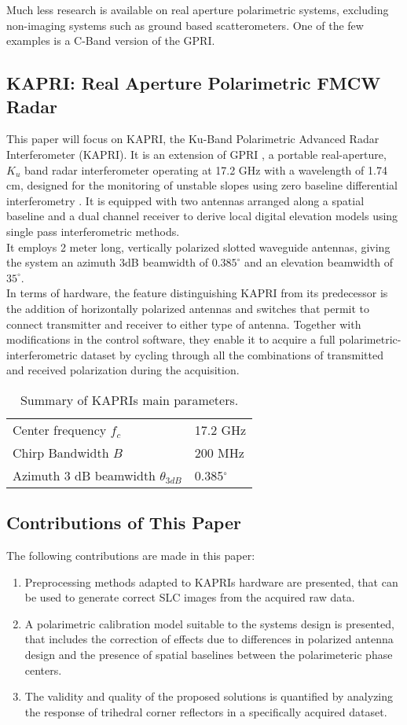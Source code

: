 Much less research is available on real aperture polarimetric systems, excluding non-imaging systems such as ground based scatterometers. One of the few examples is a C-Band version of the GPRI\cite{Cherukumilli2012}.
\subsection{KAPRI: Real Aperture Polarimetric FMCW Radar}
This paper will focus on KAPRI, the Ku-Band Polarimetric Advanced Radar Interferometer (KAPRI). It is an extension of GPRI \cite{werner_gpri_2012,Strozzi2011, Werner2008}, a portable real-aperture, $K_u$ band radar interferometer operating at 17.2 GHz with a wavelength of 1.74 cm, designed 
for the monitoring of unstable slopes using zero baseline differential interferometry \cite{Massonnet1993}. It is equipped with two antennas arranged along a spatial baseline and a dual channel receiver to derive local digital elevation models using single pass interferometric methods.\\
It employs  2 meter long, vertically polarized slotted waveguide antennas, giving the system an azimuth 3dB beamwidth of $0.385^\circ$ and an elevation beamwidth of $35^\circ$.\\
In terms of hardware, the feature distinguishing KAPRI from its predecessor is the addition of horizontally polarized antennas and switches that permit to connect transmitter and receiver to either type of antenna. Together with modifications in the control software, they enable it to acquire a full polarimetric-interferometric dataset by cycling through all the combinations of transmitted and received polarization during the acquisition.
\begin{table}
	\centering
	\begin{tabular}{ll}
		\hline
		Center frequency $f_c$ & 17.2 GHz\\
		Chirp Bandwidth $B$ & 200 MHz\\
		Azimuth 3 dB beamwidth $\theta_{3dB}$ & 0.385$^\circ$\\
		\hline
	\end{tabular}
	\caption{Summary of KAPRIs main parameters.}
\end{table}
\subsection{Contributions of This Paper}
The following contributions are made in this paper:
\begin{enumerate}
	\item Preprocessing methods adapted to KAPRIs hardware are presented, that can be used to generate correct SLC images from the acquired raw data.
	\item A polarimetric calibration model suitable to the systems design is presented, that includes the correction of effects due to differences in polarized antenna design and the presence of spatial baselines between the polarimeteric phase centers.
	\item The validity and quality of the proposed solutions is  quantified by analyzing the response of trihedral corner reflectors in a specifically acquired dataset.
\end{enumerate}
